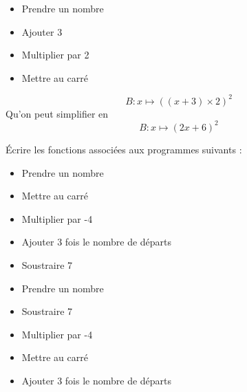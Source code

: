 \begin{frame}
    \begin{minipage}[t]{0.5\textwidth}
        \begin{itemize}
            \item Prendre un nombre 
            \item Ajouter 3
            \item Multiplier par 2
            \item Mettre au carré
        \end{itemize}
    \end{minipage}
    \hfil
    \vrule
    \hfil
    \begin{minipage}[t]{0.45\textwidth}
        $$B:x\mapsto \left((x+3)\times 2\right)^2$$ Qu'on peut simplifier en 
        $$B:x\mapsto (2x+6)^2$$
    \end{minipage}
\end{frame}

\begin{frame}
    Écrire les fonctions associées aux programmes suivants :
    \vspace*{1em}

    \begin{minipage}[t]{0.45\textwidth}
        \begin{itemize}
            \item Prendre un nombre 
            \item Mettre au carré
            \item Multiplier par -4
            \item Ajouter 3 fois le nombre de départs
            \item Soustraire 7
        \end{itemize}
    \end{minipage}
    \hfil
    \vrule
    \hfil
    \begin{minipage}[t]{0.45\textwidth}
        \begin{itemize}
            \item Prendre un nombre 
            \item Soustraire 7
            \item Multiplier par -4
            \item Mettre au carré
            \item Ajouter 3 fois le nombre de départs
        \end{itemize}
    \end{minipage}
\end{frame}

